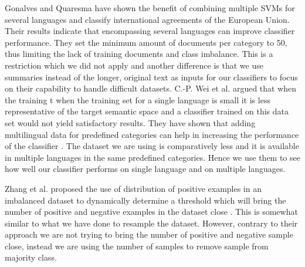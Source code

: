 Gonalves and Quaresma \cite{gonalves2010} have shown the benefit of combining multiple \glspl{SVM} for several languages and classify international agreements of the European Union. Their results indicate that encompassing several languages can improve classifier performance. They set the minimum amount of documents per category to 50, thus limiting the lack of training documents and class imbalance. This is a restriction which we did not apply and another difference is that we use summaries instead of the longer, original text as inputs for our classifiers to focus on their capability to handle difficult datasets. C.-P. Wei et al. argued that when the training t when the training set for a single language is small it is less representative of the target semantic space and a classifier trained on this data set would not yield satisfactory results. They have shown that adding multilingual data for  predefined categories can help in increasing the performance of the classifier \cite{Wei:2014:EPD:2566999.2567111}. The dataset we are using is comparatively less and it is available in multiple languages in the same predefined categories. Hence we use them to see how well our classifier performs on single language and on multiple languages.

Zhang et al. proposed the use of distribution of positive examples in an imbalanced dataset to dynamically determine a threshold which will bring the number of positive and negative examples in the dataset close \cite{Zhang2013ImbalancedMN}. This is somewhat similar to what we have done to resample the dataset. However, contrary to their approach we are not trying to bring the number of positive and negative sample close, instead we are using the number of samples to remove sample from majority class. 
